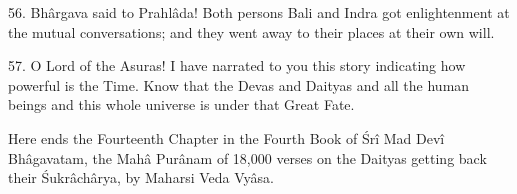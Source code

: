 56. Bh\^argava said to Prahl\^ada! Both persons Bali and Indra got enlightenment at the mutual conversations; and they went away to their places at their own will.

57. O Lord of the Asuras! I have narrated to you this story indicating how powerful is the Time. Know that the Devas and Daityas and all the human beings and this whole universe is under that Great Fate.

Here ends the Fourteenth Chapter in the Fourth Book of \'Sr\^i Mad Dev\^i Bh\^agavatam, the Mah\^a Pur\^anam of 18,000 verses on the Daityas getting back their \'Sukr\^ach\^arya, by Maharsi Veda Vy\^asa.

